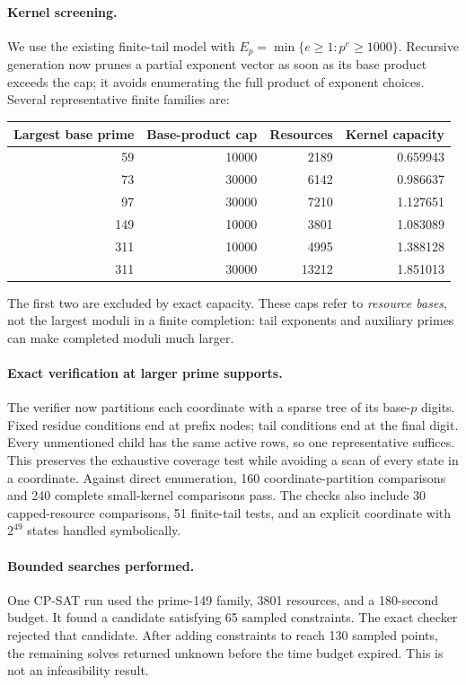 \documentclass[11pt]{article}
\begin{document}
\paragraph{Kernel screening.}
We use the existing finite-tail model with
$E_p=\min\{e\geq1:p^e\geq1000\}$. Recursive generation now prunes a
partial exponent vector as soon as its base product exceeds the cap;
it avoids enumerating the full product of exponent choices. Several
representative finite families are:
\begin{center}
\begin{tabular}{rrrr}
\toprule
Largest base prime & Base-product cap & Resources & Kernel capacity\\
\midrule
59 & 10000 & 2189 & 0.659943\\
73 & 30000 & 6142 & 0.986637\\
97 & 30000 & 7210 & 1.127651\\
149 & 10000 & 3801 & 1.083089\\
311 & 10000 & 4995 & 1.388128\\
311 & 30000 & 13212 & 1.851013\\
\bottomrule
\end{tabular}
\end{center}
The first two are excluded by exact capacity. These caps refer to
\emph{resource bases}, not the largest moduli in a finite completion:
tail exponents and auxiliary primes can make completed moduli much larger.

\paragraph{Exact verification at larger prime supports.}
The verifier now partitions each coordinate with a sparse tree of its
base-$p$ digits. Fixed residue conditions end at prefix nodes; tail
conditions end at the final digit. Every unmentioned child has the same
active rows, so one representative suffices. This preserves the exhaustive
coverage test while avoiding a scan of every state in a coordinate.
Against direct enumeration, 160 coordinate-partition comparisons and
240 complete small-kernel comparisons pass. The checks also include
30 capped-resource comparisons, 51 finite-tail tests, and an explicit
coordinate with $2^{49}$ states handled symbolically.

\paragraph{Bounded searches performed.}
One CP-SAT run used the prime-149 family, 3801 resources, and a
180-second budget. It found a candidate satisfying 65 sampled constraints.
The exact checker rejected that candidate. After adding constraints to
reach 130 sampled points, the remaining solves returned unknown before
the time budget expired. This is not an infeasibility result.
\end{document}
